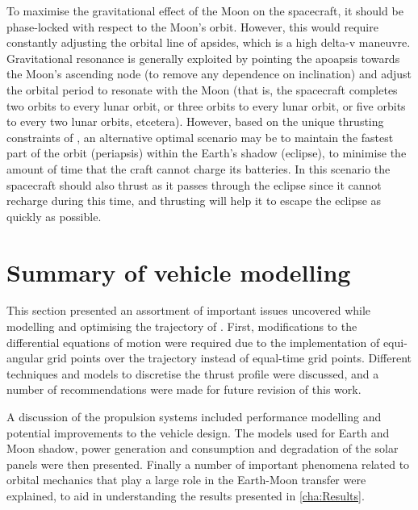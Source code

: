 To maximise the gravitational effect of the Moon on the spacecraft, it should be phase-locked with respect to the Moon's orbit. However, this would require constantly adjusting the orbital line of apsides, which is a high delta-v maneuvre. Gravitational resonance is generally exploited by pointing the apoapsis towards the Moon's ascending node (to remove any dependence on inclination) and adjust the orbital period to resonate with the Moon (that is, the spacecraft completes two orbits to every lunar orbit, or three orbits to every lunar orbit, or five orbits to every two lunar orbits, etcetera). However, based on the unique thrusting constraints of \BW, an alternative optimal scenario may be to maintain the fastest part of the orbit (periapsis) within the Earth's shadow (eclipse), to minimise the amount of time that the craft cannot charge its batteries. In this scenario the spacecraft should also thrust as it passes through the eclipse since it cannot recharge during this time, and thrusting will help it to escape the eclipse as quickly as possible. 
 

\section{Summary of vehicle modelling} \label{sec:Summary-vehicle}

This section presented an assortment of important issues uncovered while modelling and optimising the trajectory of \BW. First, modifications to the differential equations of motion were required due to the implementation of equi-angular grid points over the trajectory instead of equal-time grid points. Different techniques and models to discretise the thrust profile were discussed, and a number of recommendations were made for future revision of this work. 

A discussion of the propulsion systems included performance modelling and potential improvements to the vehicle design. The models used for Earth and Moon shadow, power generation and consumption and degradation of the solar panels were then presented. Finally a number of important phenomena related to orbital mechanics that play a large role in the Earth-Moon transfer were explained, to aid in understanding the results presented in \autoref{cha:Results}.